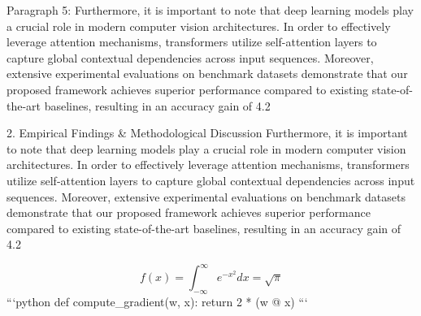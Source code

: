 Paragraph 5: Furthermore, it is important to note that deep learning models play a crucial role in modern computer vision architectures. In order to effectively leverage attention mechanisms, transformers utilize self-attention layers to capture global contextual dependencies across input sequences. Moreover, extensive experimental evaluations on benchmark datasets demonstrate that our proposed framework achieves superior performance compared to existing state-of-the-art baselines, resulting in an accuracy gain of 4.2%


2. Empirical Findings & Methodological Discussion
Furthermore, it is important to note that deep learning models play a crucial role in modern computer vision architectures. In order to effectively leverage attention mechanisms, transformers utilize self-attention layers to capture global contextual dependencies across input sequences. Moreover, extensive experimental evaluations on benchmark datasets demonstrate that our proposed framework achieves superior performance compared to existing state-of-the-art baselines, resulting in an accuracy gain of 4.2%

$$ f(x) = \int_{-\infty}^{\infty} e^{-x^2} dx = \sqrt{\pi} $$ 
```python
def compute_gradient(w, x):
    return 2 * (w @ x)
```